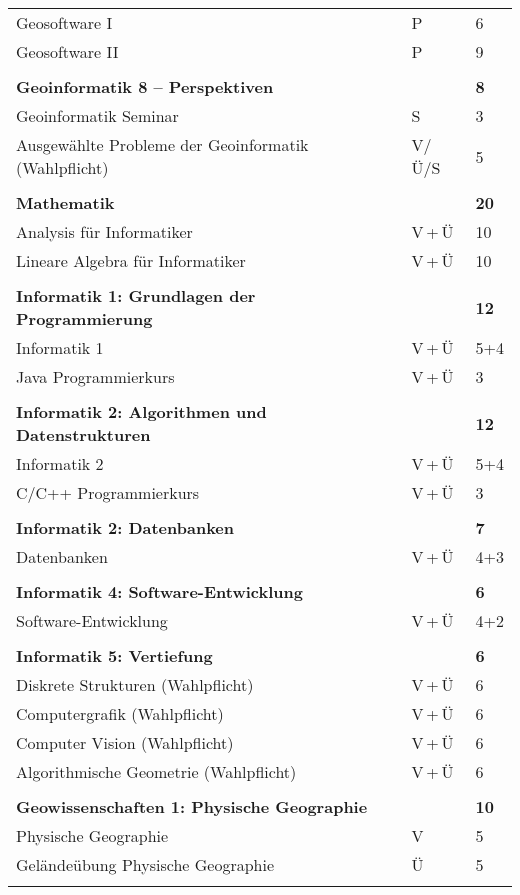 \begin{longtable}{p{} p{} p{}}
Geosoftware I & P & 6\\
Geosoftware II & P & 9\\
&&\\
\textbf{Geoinformatik 8 -- Perspektiven}&& \textbf{8}\\
Geoinformatik Seminar & S & 3\\
Ausgewählte Probleme der Geoinformatik (Wahlpflicht) & V/Ü/S & 5\\
&&\\
\textbf{Mathematik}&& \textbf{20}\\
Analysis für Informatiker  & V\,+\,Ü & 10\\
Lineare Algebra für Informatiker & V\,+\,Ü & 10\\
&&\\
\textbf{Informatik 1: Grundlagen der Programmierung} & & \textbf{12}\\
Informatik 1 & V\,+\,Ü & 5+4\\ 
Java Programmierkurs & V\,+\,Ü & 3\\
&&\\
\textbf{Informatik 2: Algorithmen und Datenstrukturen} & & \textbf{12}\\
Informatik 2 & V\,+\,Ü & 5+4\\ 
C/C++ Programmierkurs & V\,+\,Ü & 3\\
&&\\
\textbf{Informatik 2: Datenbanken} & & \textbf{7}\\
Datenbanken & V\,+\,Ü & 4+3\\ 
&&\\
\textbf{Informatik 4: Software-Entwicklung}& &\textbf{6}\\
Software-Entwicklung & V\,+\,Ü & 4+2\\
&&\\
\textbf{Informatik 5: Vertiefung} & & \textbf{6}\\
Diskrete Strukturen (Wahlpflicht) & V\,+\,Ü & 6\\
Computergrafik (Wahlpflicht) & V\,+\,Ü & 6\\
Computer Vision (Wahlpflicht) & V\,+\,Ü & 6\\
Algorithmische Geometrie (Wahlpflicht) & V\,+\,Ü & 6\\
&&\\
\textbf{Geowissenschaften 1: Physische Geographie} & & \textbf{10}\\
Physische Geographie & V & 5\\
Geländeübung Physische Geographie & Ü & 5\\
&&\\

\end{longtable}
